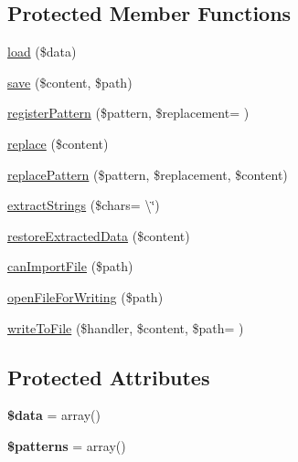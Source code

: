 \subsection*{Protected Member Functions}
\begin{DoxyCompactItemize}
\item 
\hyperlink{classMatthiasMullie_1_1Minify_1_1Minify_a72c3c3b0c5f40159f0562464d2321622}{load} (\$data)
\item 
\hyperlink{classMatthiasMullie_1_1Minify_1_1Minify_a609a7abd9a268cdf47dacbe9169cdb09}{save} (\$content, \$path)
\item 
\hyperlink{classMatthiasMullie_1_1Minify_1_1Minify_a7fe4a2f61edb6d0041f30a297f823941}{register\+Pattern} (\$pattern, \$replacement= \textquotesingle{}\textquotesingle{})
\item 
\hyperlink{classMatthiasMullie_1_1Minify_1_1Minify_a67a9afda5da913eaa78537d6663db7b1}{replace} (\$content)
\item 
\hyperlink{classMatthiasMullie_1_1Minify_1_1Minify_a388b7862eeefb29467bd6797e4ec6ce4}{replace\+Pattern} (\$pattern, \$replacement, \$content)
\item 
\hyperlink{classMatthiasMullie_1_1Minify_1_1Minify_af94273912df2d57d13bd0387d390d365}{extract\+Strings} (\$chars= \textquotesingle{}\textbackslash{}\textquotesingle{}\char`\"{}\textquotesingle{}) 
\item 
\hyperlink{classMatthiasMullie_1_1Minify_1_1Minify_a2dcd7d9daae771849ee27cbba64e31e6}{restore\+Extracted\+Data} (\$content)
\item 
\hyperlink{classMatthiasMullie_1_1Minify_1_1Minify_a2a8fd2f70bdeda26cb7e3f8ed1f81839}{can\+Import\+File} (\$path)
\item 
\hyperlink{classMatthiasMullie_1_1Minify_1_1Minify_ac0176ecf1352c0cb48414d1dbfc01e42}{open\+File\+For\+Writing} (\$path)
\item 
\hyperlink{classMatthiasMullie_1_1Minify_1_1Minify_aab7196423de2e10863d47e7cbb0072f7}{write\+To\+File} (\$handler, \$content, \$path= \textquotesingle{}\textquotesingle{})
\end{DoxyCompactItemize}
\subsection*{Protected Attributes}
\begin{DoxyCompactItemize}
\item 
{\bfseries \$data} = array()\hypertarget{classMatthiasMullie_1_1Minify_1_1Minify_aa85677753f01e1bba24962d94ce28320}{}\label{classMatthiasMullie_1_1Minify_1_1Minify_aa85677753f01e1bba24962d94ce28320}

\item 
{\bfseries \$patterns} = array()\hypertarget{classMatthiasMullie_1_1Minify_1_1Minify_a5f6929c0fc987a30afcd8fd8fe4cb9c6}{}\label{classMatthiasMullie_1_1Minify_1_1Minify_a5f6929c0fc987a30afcd8fd8fe4cb9c6}

\end{DoxyCompactItemize}


